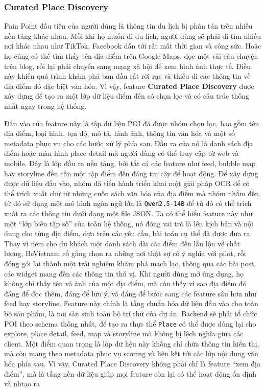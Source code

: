 \subsubsection{Curated Place Discovery}
\contrib

Pain Point đầu tiên của người dùng là thông tin du lịch bị phân tán trên
nhiều nền tảng khác nhau. Mỗi khi họ muốn đi du lịch, người dùng sẽ phải đi tìm
nhiều nơi khác nhau như TikTok, Facebook dẫn tới rất mất thời gian và công sức. Hoặc họ cũng có thể tìm thấy tên địa điểm trên
Google Maps, đọc một vài câu chuyện trên blog, rồi lại phải chuyển sang
mạng xã hội để xem hình ảnh thực tế. Điều này khiến quá trình khám phá
ban đầu rất rời rạc và thiếu đi các thông tin về địa điểm đó đặc biệt văn hóa. Vì vậy, feature
\textbf{Curated Place Discovery} được xây dựng để tạo ra một lớp dữ liệu
điểm đến có chọn lọc và có cấu trúc thống nhất ngay trong hệ thống.

Đầu vào của feature này là tập dữ liệu POI đã được nhóm chọn lọc, bao
gồm tên địa điểm, loại hình, tọa độ, mô tả, hình ảnh, thông tin văn hóa
và một số metadata phục vụ cho các bước xử lý phía sau. Đầu ra của nó là
danh sách địa điểm hoặc màn hình place detail mà người dùng có thể truy
cập từ web và mobile. Đây là lớp đầu ra nền tảng, bởi tất cả các feature
như feed, bubble map hay storyline đều cần một tập điểm đến đáng tin cậy
để hoạt động. Để xây dựng được dữ liệu đầu vào, nhóm đã tiến hành triển khai một giải pháp
OCR để có thể trích xuất chữ từ những cuốn sách văn hóa của địa điểm mà nhóm nhắm đến, từ đó
sử dụng một mô hình ngôn ngữ lớn là \texttt{Qwen2.5-14B} để từ đó có thể trích xuất ra các thông
tin dưới dạng một file JSON. Ta có thể hiểu feature này như một
``lớp biên tập số'' của toàn hệ thống, nó đóng vai trò là lên kịch bản và nội dung cho từng địa điểm,
dựa trên các yêu cầu, bài toán cụ thể đã được đưa ra. Thay vì ném cho du khách một danh
sách dài các điểm đến lẫn lộn về chất lượng, BeVietnam cố gắng chọn ra
những nơi thật sự có ý nghĩa với pilot, rồi đóng gói lại thành một trải
nghiệm khám phá mạch lạc, thông qua các bài post, các widget mang đến các thông tin
thú vị. Khi người dùng mở ứng dụng, họ không chỉ thấy
tên và ảnh của một địa điểm, mà còn thấy vì sao địa điểm đó đáng để đọc
thêm, đáng để lưu ý, và đáng để bước sang các feature sâu hơn như feed
hay storyline. Feature này chính là tầng chuẩn hóa dữ liệu đầu
vào cho toàn bộ sản phẩm, là nơi sản sinh toàn bộ tri thứ của dự án. Backend sẽ phải tổ chức POI theo schema thống
nhất, để tạo ra thực thể \texttt{Place} có thể được dùng lại cho
explore, place detail, feed, map và storyline mà không bị lệch nghĩa
giữa các client. Một điểm quan trọng là lớp dữ liệu này không chỉ
chứa thông tin hiển thị, mà còn mang theo metadata phục vụ scoring và
liên kết tới các lớp nội dung văn hóa phía sau. Vì vậy, Curated Place
Discovery không phải chỉ là feature ``xem địa điểm'', mà là tầng nền dữ
liệu giúp mọi feature còn lại có thể hoạt động ổn định và nhtạo ra

